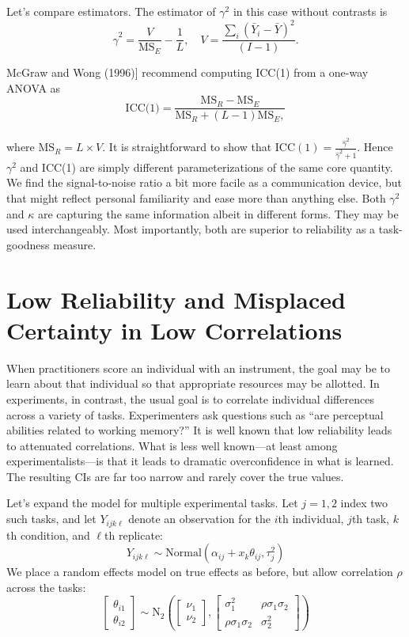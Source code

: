 \documentclass[
  ,man]{apa6}
\begin{document}
Let's compare estimators. The estimator of \(\gamma^2\) in this case without contrasts is
\[
\hat{\gamma}^2=\frac{V}{\mbox{MS}_E}-\frac{1}{L},\quad
V=\frac{\sum_i (\bar{Y}_i-\bar{Y})^2}{(I-1)}.
\]

McGraw and Wong (1996){]} recommend computing ICC(1) from a one-way ANOVA as
\[
\mbox{ICC(1)}=\frac{\mathrm{MS}_R - \mathrm{MS}_E}{\mathrm{MS}_R + (L - 1)\mathrm{MS}_E,}
\]\\
where \(\mathrm{MS}_R = L\times V\). It is straightforward to show that \(\mbox{ICC}(1) = \frac{\hat{\gamma}^2}{\hat{\gamma}^2 + 1}\). Hence \(\gamma^2\) and ICC(1) are simply different parameterizations of the same core quantity. We find the signal-to-noise ratio a bit more facile as a communication device, but that might reflect personal familiarity and ease more than anything else. Both \(\gamma^2\) and \(\kappa\) are capturing the same information albeit in different forms. They may be used interchangeably. Most importantly, both are superior to reliability as a task-goodness measure.

\section{Low Reliability and Misplaced Certainty in Low Correlations}\label{low-reliability-and-misplaced-certainty-in-low-correlations}

When practitioners score an individual with an instrument, the goal may be to learn about that individual so that appropriate resources may be allotted. In experiments, in contrast, the usual goal is to correlate individual differences across a variety of tasks. Experimenters ask questions such as ``are perceptual abilities related to working memory?'' It is well known that low reliability leads to attenuated correlations. What is less well known---at least among experimentalists---is that it leads to dramatic overconfidence in what is learned. The resulting CIs are far too narrow and rarely cover the true values.

Let's expand the model for multiple experimental tasks. Let \(j=1,2\) index two such tasks, and let \(Y_{ijk\ell}\) denote an observation for the \(i\)th individual, \(j\)th task, \(k\)th condition, and \(\ell\)th replicate:
\[
Y_{ijk\ell} \sim \mbox{Normal}(\alpha_{ij}+x_k\theta_{ij},\tau_j^2)
\]
We place a random effects model on true effects as before, but allow correlation \(\rho\) across the tasks:
\[
\begin{bmatrix} \theta_{i1} \\ \theta_{i2} \end{bmatrix} \sim \mbox{N}_2 \left( \begin{bmatrix} \nu_1 \\ \nu_2 \end{bmatrix}, \begin{bmatrix}
\sigma_1^2 & \rho \sigma_1 \sigma_2 \\
\rho \sigma_1 \sigma_2 & \sigma_2^2
\end{bmatrix}\right)
\]
\end{document}
